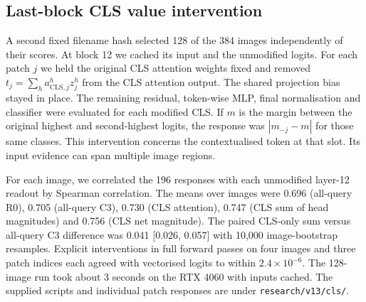\subsection{Last-block CLS value intervention}
A second fixed filename hash selected 128 of the 384 images independently of their scores. At block 12 we cached its input and the unmodified logits. For each patch $j$ we held the original CLS attention weights fixed and removed $t_j=\sum_h a^h_{\mathrm{CLS},j}z_j^h$ from the CLS attention output. The shared projection bias stayed in place. The remaining residual, token-wise MLP, final normalisation and classifier were evaluated for each modified CLS. If $m$ is the margin between the original highest and second-highest logits, the response was $|m_{-j}-m|$ for those same classes. This intervention concerns the contextualised token at that slot. Its input evidence can span multiple image regions.

For each image, we correlated the 196 responses with each unmodified layer-12 readout by Spearman correlation. The means over images were 0.696 (all-query R0), 0.705 (all-query C3), 0.730 (CLS attention), 0.747 (CLS sum of head magnitudes) and 0.756 (CLS net magnitude). The paired CLS-only sum versus all-query C3 difference was 0.041 [0.026, 0.057] with 10,000 image-bootstrap resamples. Explicit interventions in full forward passes on four images and three patch indices each agreed with vectorised logits to within $2.4\times10^{-6}$. The 128-image run took about 3 seconds on the RTX 4060 with inputs cached. The supplied scripts and individual patch responses are under \texttt{research/v13/cls/}.

